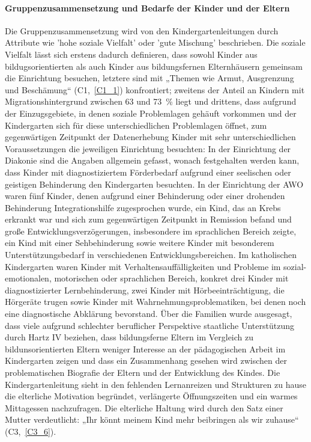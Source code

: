 \paragraph{Gruppenzusammensetzung und Bedarfe der Kinder und der Eltern}
Die Gruppenzusammensetzung wird von den Kindergartenleitungen durch Attribute wie 'hohe soziale Vielfalt' oder 'gute Mischung' beschrieben. Die soziale Vielfalt lässt sich erstens dadurch definieren, dass sowohl Kinder aus bildugsorientierten als auch Kinder aus bildungsfernen Elternhäusern gemeinsam die Einrichtung besuchen, letztere sind mit „Themen wie Armut, Ausgrenzung und Beschämung“ (C1,~\ref{C1_1}) konfrontiert; zweitens der Anteil an Kindern mit Migrationshintergrund zwischen 63 und 73 \,\% liegt und drittens, dass aufgrund der Einzugsgebiete, in denen soziale Problemlagen gehäuft vorkommen und der Kindergarten sich für diese unterschiedlichen Problemlagen öffnet, zum gegenwärtigen Zeitpunkt der Datenerhebung Kinder mit sehr unterschiedlichen Voraussetzungen die jeweiligen Einrichtung besuchten: 
In der Einrichtung der Diakonie sind die Angaben allgemein gefasst, wonach festgehalten werden kann, dass Kinder mit diagnostiziertem Förderbedarf aufgrund einer seelischen oder geistigen Behinderung den Kindergarten besuchten. In der Einrichtung der AWO waren fünf Kinder, denen aufgrund einer Behinderung oder einer drohenden Behinderung Integrationshilfe zugesprochen wurde, ein Kind, das an Krebs erkrankt war und sich zum gegenwärtigen Zeitpunkt in Remission befand und große Entwicklungsverzögerungen, insbesondere im sprachlichen Bereich zeigte, ein Kind mit einer Sehbehinderung sowie weitere Kinder mit besonderem Unterstützungsbedarf in verschiedenen Entwicklungsbereichen. 
Im katholischen Kindergarten waren Kinder mit Verhaltensauffälligkeiten und Probleme im sozial-emotionalen, motorischen oder sprachlichen Bereich, konkret drei Kinder mit diagnostizierter Lernbehinderung, zwei Kinder mit Hörbeeinträchtigung, die Hörgeräte trugen sowie Kinder mit Wahrnehmungsproblematiken, bei denen noch eine diagnostische Abklärung bevorstand.
Über die Familien wurde ausgesagt, dass viele aufgrund schlechter beruflicher Perspektive staatliche Unterstützung durch Hartz IV beziehen, dass bildungsferne Eltern im Vergleich zu bildunsorientierten Eltern weniger Interesse an der pädagogischen Arbeit im Kindergarten zeigen und dass ein Zusammenhang gesehen wird zwischen der problematischen Biografie der Eltern und der Entwicklung des Kindes. Die Kindergartenleitung sieht in den fehlenden Lernanreizen und Strukturen zu hause die elterliche Motivation begründet, verlängerte Öffnungszeiten und ein warmes Mittagessen nachzufragen. Die elterliche Haltung wird durch den Satz einer Mutter verdeutlicht: „Ihr könnt meinem Kind mehr beibringen als wir zuhause“ (C3,~\ref{C3_6}).

